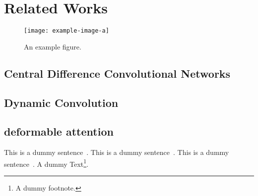 \chapter{Related Works} 
\begin{figure}
    \centering
    \texttt{[image: example-image-a]}
    \caption{An example figure.}
    \label{fig:example-a}
\end{figure}

\section{Central Difference Convolutional Networks}
\lipsum[1]
\section{Dynamic Convolution}
\lipsum[1]
\section{deformable attention}
\lipsum[1]

This is a dummy sentence~\cite{carion2020endtoend}. This is a dummy sentence~\cite{Li_2022_CVPR}. This is a dummy sentence~\cite{lv2023detrs}. A dummy Text\footnote{A dummy footnote.}.
